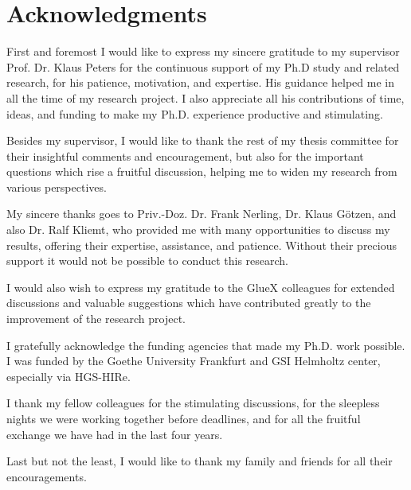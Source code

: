 \section*{Acknowledgments}

First and foremost I would like to express my sincere gratitude to my supervisor Prof. Dr. Klaus Peters for the continuous support of my Ph.D study and related research, for his patience, motivation, and expertise. His guidance helped me in all the time of my research project. I also appreciate all his contributions of time, ideas, and funding to make my Ph.D. experience productive and stimulating.
~\par Besides my supervisor, I would like to thank the rest of my thesis committee for their insightful comments and encouragement, but also for the important questions which rise a fruitful discussion, helping me to widen my research from various perspectives.
~\par My sincere thanks goes to Priv.-Doz. Dr. Frank Nerling, Dr. Klaus G\"otzen, and also Dr. Ralf Kliemt, who provided me with many opportunities to discuss my results, offering their expertise, assistance, and patience. Without their precious support it would not be possible to conduct this research.
~\par I would also wish to express my gratitude to the GlueX colleagues for extended discussions and valuable suggestions which have contributed greatly to the improvement of the research project.
~\par I gratefully acknowledge the funding agencies that made my Ph.D. work possible. I was funded by the Goethe University Frankfurt and GSI Helmholtz center, especially via HGS-HIRe.
~\par I thank my fellow colleagues for the stimulating discussions, for the sleepless nights we were working together before deadlines, and for all the fruitful exchange we have had in the last four years.
~\par Last but not the least, I would like to thank my family and friends for all their encouragements.

